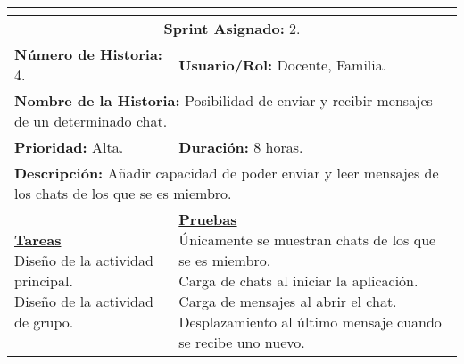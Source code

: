 \resizebox{15cm}{!} {
	\begin{tabular}{|l|l|}
		\hline
		\multicolumn{2}{|c|}{\cellcolor[HTML]{343434}{\color[HTML]{FFFFFF} \textbf{Historia de Usuario}}} \\
		\hline
		\multicolumn{2}{|c|}{\textbf{Sprint Asignado:} 2.} \\
		\hline
		\textbf{Número de Historia:} 4. & \textbf{Usuario/Rol:} Docente, Familia.\\
		\hline
		\multicolumn{2}{|l|}{\textbf{Nombre de la Historia:} Posibilidad de enviar y recibir mensajes de un determinado chat.} \\
		\hline
		\textbf{Prioridad:} Alta. & \textbf{Duración:} 8 horas.\\
		\hline
		\multicolumn{2}{|l|}{\textbf{Descripción:} Añadir capacidad de poder enviar y leer mensajes de los chats de los que se es miembro.} \\
		\hline
		\specialcell{\underline{\textbf{Tareas}} \\ Diseño de la actividad principal. \\ Diseño de la actividad de grupo.} & \specialcell{\underline{\textbf{Pruebas}} \\ Únicamente se muestran chats de los que se es miembro. \\ Carga de chats al iniciar la aplicación. \\ Carga de mensajes al abrir el chat. \\ Desplazamiento al último mensaje cuando se recibe uno nuevo.} \\
		\hline
	\end{tabular}
}







